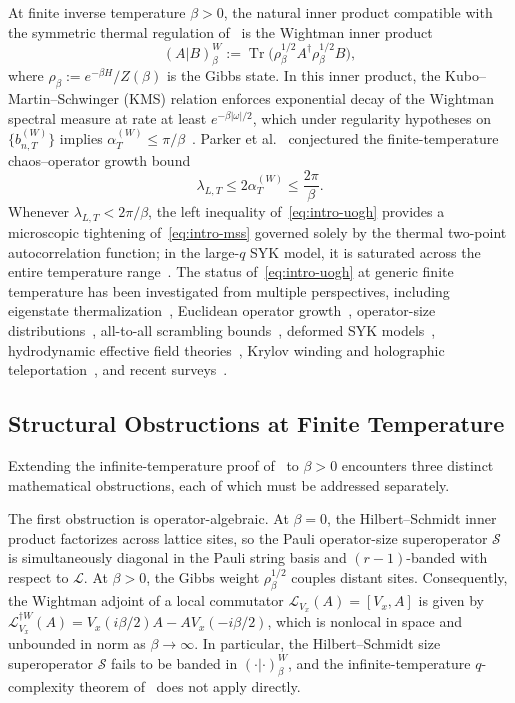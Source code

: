 \documentclass[11pt,a4paper]{article}
\numberwithin{equation}{section}
\theoremstyle{plain}
\theoremstyle{definition}
\newcommand{\Tr}{\operatorname{Tr}}
\begin{document}
At finite inverse temperature $\beta > 0$, the natural inner product compatible with the symmetric thermal regulation of~\cite{MSS2016} is the Wightman inner product
\begin{equation}\label{eq:intro-wightman}
  (A|B)_\beta^W := \Tr\!\bigl(\rho_\beta^{1/2} A^\dagger \rho_\beta^{1/2} B\bigr),
\end{equation}
where $\rho_\beta := e^{-\beta H}/Z(\beta)$ is the Gibbs state. In this inner product, the Kubo--Martin--Schwinger (KMS) relation enforces exponential decay of the Wightman spectral measure at rate at least $e^{-\beta|\omega|/2}$, which under regularity hypotheses on $\{b_{n,T}^{(W)}\}$ implies $\alpha_T^{(W)} \le \pi/\beta$~\cite{Parker2019,Avdoshkin2020}. Parker et al.~\cite{Parker2019} conjectured the finite-temperature chaos--operator growth bound
\begin{equation}\label{eq:intro-uogh}
  \lambda_{L,T} \le 2\alpha_T^{(W)} \le \frac{2\pi}{\beta}.
\end{equation}
Whenever $\lambda_{L,T} < 2\pi/\beta$, the left inequality of~\eqref{eq:intro-uogh} provides a microscopic tightening of~\eqref{eq:intro-mss} governed solely by the thermal two-point autocorrelation function; in the large-$q$ SYK model, it is saturated across the entire temperature range~\cite{Parker2019}. The status of~\eqref{eq:intro-uogh} at generic finite temperature has been investigated from multiple perspectives, including eigenstate thermalization~\cite{Murthy2019}, Euclidean operator growth~\cite{Avdoshkin2020}, operator-size distributions~\cite{Roberts2018,Qi2019}, all-to-all scrambling bounds~\cite{Yin2020}, deformed SYK models~\cite{Garcia2025}, hydrodynamic effective field theories~\cite{Demulder2026}, Krylov winding and holographic teleportation~\cite{Perugu2026}, and recent surveys~\cite{Baiguera2025}.

\subsection{Structural Obstructions at Finite Temperature}\label{subsec:obstructions}

Extending the infinite-temperature proof of~\cite{Parker2019} to $\beta > 0$ encounters three distinct mathematical obstructions, each of which must be addressed separately.

The first obstruction is operator-algebraic. At $\beta = 0$, the Hilbert--Schmidt inner product factorizes across lattice sites, so the Pauli operator-size superoperator $\mathcal{S}$ is simultaneously diagonal in the Pauli string basis and $(r-1)$-banded with respect to $\mathcal{L}$. At $\beta > 0$, the Gibbs weight $\rho_\beta^{1/2}$ couples distant sites. Consequently, the Wightman adjoint of a local commutator $\mathcal{L}_{V_x}(A) = [V_x, A]$ is given by $\mathcal{L}_{V_x}^{\dagger W}(A) = V_x(i\beta/2)A - A V_x(-i\beta/2)$, which is nonlocal in space and unbounded in norm as $\beta\to\infty$. In particular, the Hilbert--Schmidt size superoperator $\mathcal{S}$ fails to be banded in $(\cdot|\cdot)_\beta^W$, and the infinite-temperature $q$-complexity theorem of~\cite[App.~E]{Parker2019} does not apply directly.
\end{document}
